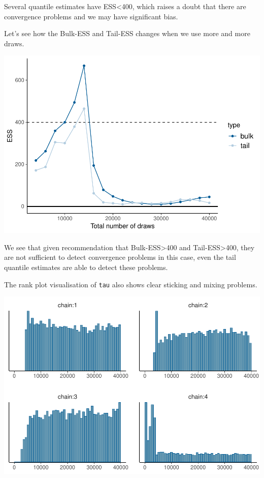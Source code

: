 \documentclass[american,]{article}
\begin{document}
Several quantile estimates have ESS\textless{}400, which raises a doubt
that there are convergence problems and we may have significant bias.

Let's see how the Bulk-ESS and Tail-ESS changes when we use more and
more draws.

\includegraphics{graphics/change-ess-fit-cp2-tau-1.pdf}

We see that given recommendation that Bulk-ESS\textgreater{}400 and
Tail-ESS\textgreater{}400, they are not sufficient to detect convergence
problems in this case, even the tail quantile estimates are able to
detect these problems.

The rank plot visualisation of \texttt{tau} also shows clear sticking
and mixing problems.

\includegraphics{graphics/hist-fit-cp2-tau-1.pdf}
\end{document}

